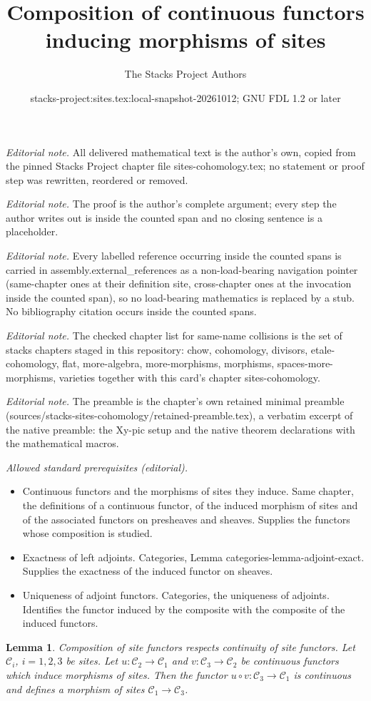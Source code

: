 \documentclass[10pt,a4paper]{amsart}
\title{Composition of continuous functors inducing morphisms of sites}
\author{The Stacks Project Authors}
\date{stacks-project:sites.tex:local-snapshot-20261012; GNU FDL 1.2 or later}
\newenvironment{slogan}{\comment}{\endcomment}
\theoremstyle{plain}
\newtheorem{lemma}[subsection]{Lemma}
\theoremstyle{definition}
\theoremstyle{remark}
\numberwithin{equation}{subsection}
\begin{document}
\maketitle
\noindent\textit{Editorial note.} All delivered mathematical text is the author's own, copied from the pinned Stacks Project chapter file sites-cohomology.tex; no statement or proof step was rewritten, reordered or removed.\par\medskip
\noindent\textit{Editorial note.} The proof is the author's complete argument; every step the author writes out is inside the counted span and no closing sentence is a placeholder.\par\medskip
\noindent\textit{Editorial note.} Every labelled reference occurring inside the counted spans is carried in assembly.external\_references as a non-load-bearing navigation pointer (same-chapter ones at their definition site, cross-chapter ones at the invocation inside the counted span), so no load-bearing mathematics is replaced by a stub. No bibliography citation occurs inside the counted spans.\par\medskip
\noindent\textit{Editorial note.} The checked chapter list for same-name collisions is the set of stacks chapters staged in this repository: chow, cohomology, divisors, etale-cohomology, flat, more-algebra, more-morphisms, morphisms, spaces-more-morphisms, varieties together with this card's chapter sites-cohomology.\par\medskip
\noindent\textit{Editorial note.} The preamble is the chapter's own retained minimal preamble (sources/stacks-sites-cohomology/retained-preamble.tex), a verbatim excerpt of the native preamble: the Xy-pic setup and the native theorem declarations with the mathematical macros.\par\medskip
\noindent\textit{Allowed standard prerequisites (editorial).}\begin{itemize}
\item Continuous functors and the morphisms of sites they induce. Same chapter, the definitions of a continuous functor, of the induced morphism of sites and of the associated functors on presheaves and sheaves. Supplies the functors whose composition is studied.
\item Exactness of left adjoints. Categories, Lemma categories-lemma-adjoint-exact. Supplies the exactness of the induced functor on sheaves.
\item Uniqueness of adjoint functors. Categories, the uniqueness of adjoints. Identifies the functor induced by the composite with the composite of the induced functors.
\end{itemize}\medskip
\begin{lemma}
\label{lemma-composition-morphisms-sites}
\begin{slogan}
Composition of site functors respects continuity of site functors.
\end{slogan}
Let $\mathcal{C}_i$, $i = 1, 2, 3$ be sites. Let
$u : \mathcal{C}_2 \to \mathcal{C}_1$ and
$v : \mathcal{C}_3 \to \mathcal{C}_2$ be continuous functors
which induce morphisms of sites. Then the functor
$u \circ v : \mathcal{C}_3 \to \mathcal{C}_1$ is continuous and
defines a morphism of sites $\mathcal{C}_1 \to \mathcal{C}_3$.
\end{lemma}
\end{document}
